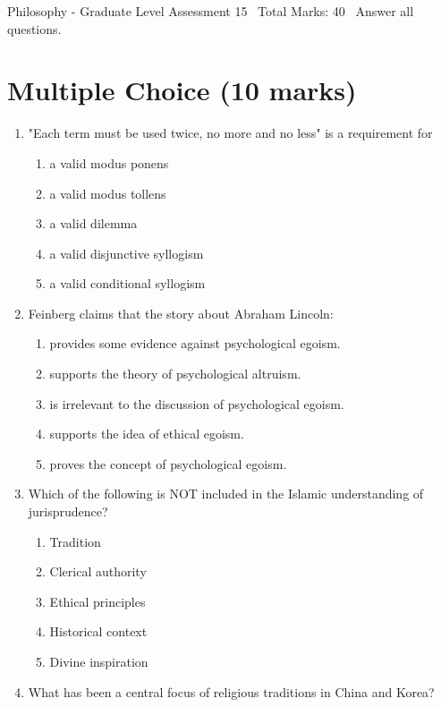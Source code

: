 \documentclass[12pt]{article}
\begin{document}
\begin{center}
Philosophy - Graduate Level Assessment 15 \
Total Marks: 40 \
Answer all questions.
\end{center}

\section*{Multiple Choice (10 marks)}
\begin{enumerate}[label=\arabic*.]
\item "Each term must be used twice, no more and no less" is a requirement for
\begin{enumerate}[label=(\alph*)]
    \item a valid modus ponens
    \item a valid modus tollens
    \item a valid dilemma
    \item a valid disjunctive syllogism
    \item a valid conditional syllogism
\end{enumerate}
\item Feinberg claims that the story about Abraham Lincoln:
\begin{enumerate}[label=(\alph*)]
    \item provides some evidence against psychological egoism.
    \item supports the theory of psychological altruism.
    \item is irrelevant to the discussion of psychological egoism.
    \item supports the idea of ethical egoism.
    \item proves the concept of psychological egoism.
\end{enumerate}
\item Which of the following is NOT included in the Islamic understanding of jurisprudence?
\begin{enumerate}[label=(\alph*)]
    \item Tradition
    \item Clerical authority
    \item Ethical principles
    \item Historical context
    \item Divine inspiration
\end{enumerate}
\item What has been a central focus of religious traditions in China and Korea?
\begin{enumerate}[label=(\alph*)]

\end{enumerate}
\end{enumerate}
\end{document}
